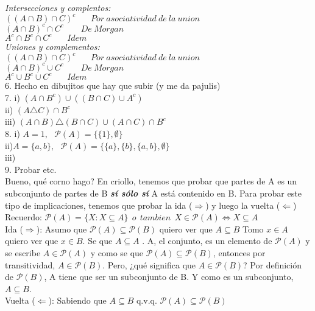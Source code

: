 \documentclass[10pt, a4paper]{book}
\begin{document}
\textit{Intersecciones y complentos:}\\
\(((A\cap B)\cap C)^{c}\:\:\:\:\:\:\:\:Por\:asociatividad\: de\: la\: union\)\\
\((A\cap B)^{c}\cap C^{c}\:\:\:\:\:\:\:\:\:De\: Morgan\)\\
\(A^{c}\cap B^{c}\cap C^{c}\:\:\:\:\:\:\:\:Idem\)\\
\textit{Uniones y complementos:}\\
\(((A\cap B)\cap C)^{c}\:\:\:\:\:\:\:\:Por\:asociatividad\: de\: la\: union\)\\
\((A\cap B)^{c}\cup C^{c}\:\:\:\:\:\:\:\:\:De\: Morgan\)\\
\(A^{c}\cup B^{c}\cup C^{c}\:\:\:\:\:\:\:\:Idem\)\\
6. Hecho en dibujitos que hay que subir (y me da pajulis)\\
7. i) \((A\cap B^{c})\cup((B\cap C) \cup A^{c})\)\\
ii) \((A\triangle C)\cap B^{c}\)\\
iii) \((A\cap B)\triangle(B\cap C)\cup(A\cap C)\cap B^{c}\)\\
8. i) \(A={1},\:\:\:\mathcal{P}(A)=\{\{1\},\emptyset\}\)\\
ii)\(A=\{a,b\},\:\:\:\mathcal{P}(A)=\{\{a\},\{b\},\{a,b\},\emptyset\}\)\\
iii)\\
9. Probar etc. \\
Bueno, qué corno hago? En criollo, tenemos que probar que partes de A es un subconjunto de partes de B \textbf{\textit{sí sólo sí}} A está contenido en B. Para probar este tipo de implicaciones, tenemos que probar la ida (\(\Rightarrow\)) y luego la vuelta (\(\Leftarrow\))\\
Recuerdo: \(\mathcal{P}(A)=\{X:X\subseteq A\}\:\: o\:\:tambien\:\: X \in \mathcal{P}(A)\iff X\subseteq A\)\\
Ida (\(\Rightarrow\)): Asumo que \(\mathcal{P}(A)\subseteq \mathcal{P}(B)\) quiero ver que \(A\subseteq B \)
Tomo \(x \in A \) quiero ver que \(x \in B \). Se que \(A \subseteq A\) . A, el conjunto, es un elemento de \(\mathcal{P}(A)\) y se escribe \(A\in \mathcal{P}(A)\) y como se que \(\mathcal{P}(A)\subseteq \mathcal{P}(B)\), entonces por transitividad,  \(A\in \mathcal{P}(B)\). Pero, ¿qué significa que \(A\in \mathcal{P}(B)\)? Por definición de \(\mathcal{P}(B)\), A tiene que ser un subconjunto de B. Y como es un subconjunto,  \(A\subseteq B \).\\
Vuelta (\(\Leftarrow\)): Sabiendo que \(A\subseteq B \) q.v.q. \(\mathcal{P}(A)\subseteq \mathcal{P}(B)\) \\
\end{document}
